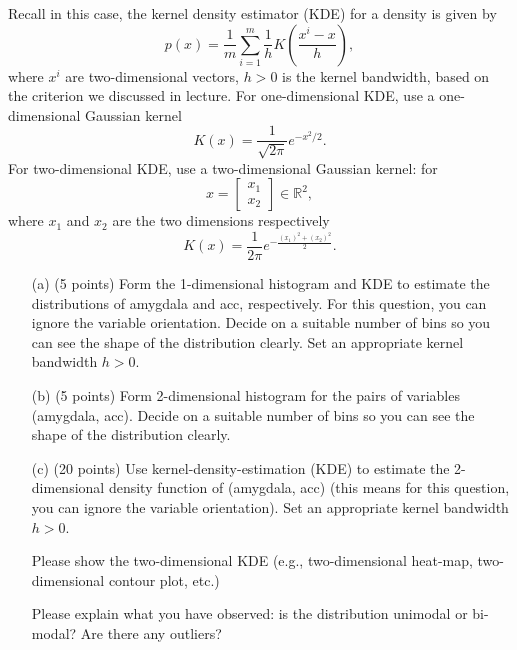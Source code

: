 \documentclass[12pt]{article}
\begin{document}
Recall in this case, the kernel density estimator (KDE) for a density is given by
 \[
 p(x) = \frac 1 m \sum_{i=1}^m \frac 1 h
 K\left(
 \frac{x^i - x}{h}
 \right),
 \]
where $x^i$ are two-dimensional vectors, $h >0$ is the kernel bandwidth, based on the criterion we discussed in lecture. 
For one-dimensional KDE,  use a one-dimensional Gaussian kernel
\[
K(x) = \frac{1}{\sqrt{2\pi}} e^{-x^2/2}.
\]
For two-dimensional KDE, use a two-dimensional Gaussian kernel: for \[x = \begin{bmatrix}x_1\\x_2\end{bmatrix}\in \mathbb R^2,\] where $x_1$ and $x_2$ are the two dimensions respectively \[K(x) = \frac{1}{2\pi} e^{-\frac{(x_1)^2 + (x_2)^2}{2}}.\] 
  
 \begin{enumerate}
 
 
 \item[(a)] (5 points) Form the 1-dimensional histogram and KDE to estimate the distributions of \textsf{amygdala} and \textsf{acc}, respectively. For this question, you can ignore the variable \textsf{orientation}. Decide on a suitable number of bins so you can see the shape of the distribution clearly. Set an appropriate kernel bandwidth $h >0$. 
 
 
 
 \item[(b)] (5 points) Form 2-dimensional histogram for the pairs of variables (\textsf{amygdala}, \textsf{acc}). Decide on a suitable number of bins so you can see the shape of the distribution clearly. 
 
 \item[(c)] (20 points) Use kernel-density-estimation (KDE) to estimate the 2-dimensional density function of (\textsf{amygdala}, \textsf{acc}) (this means for this question, you can ignore the variable \textsf{orientation}). Set an appropriate kernel bandwidth $h >0$. 

Please show the two-dimensional KDE (e.g., two-dimensional heat-map, two-dimensional contour plot, etc.)

Please explain what you have observed: is the distribution unimodal or bi-modal? Are there any outliers?


\end{enumerate}
\end{document}
